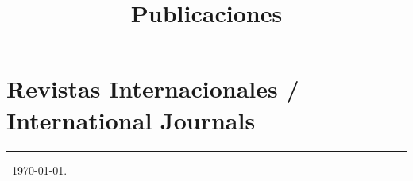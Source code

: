 \documentclass{article}
\title{Publicaciones}
\date{}
\begin{document}
\maketitle

\tableofcontents

\renewcommand{\refname}{}
\section{Revistas Internacionales / International Journals}


\hrule
\currenttime~\today.
\end{document}
